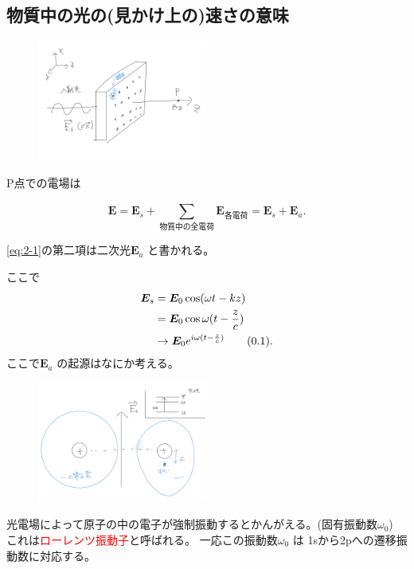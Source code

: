 \documentclass[dvipdfmx]{jsarticle}
\def\theequation{\thesection.\arabic{equation}}
\begin{document}
\subsection{物質中の光の(見かけ上の)速さの意味}
\begin{figure}[H]
	\centering
	\includegraphics[width=0.5\textwidth]{fig2/Fig-3.jpg}
	\label{fig:fig2-Fig-3-jpg}
\end{figure}
P点での電場は
\begin{tcolorbox}[colback=green!10!white]
\begin{equation}
\label{eq:2-1}
\bm{E}=\bm{E}_s+\sum_{\text{物質中の全電荷}}^{} \bm{E}_{\text{各電荷}}=\bm{E}_s+\bm{E}_a
.\end{equation}
\end{tcolorbox}
\eqref{eq:2-1}の第二項は二次光$\bm{E}_a$ と書かれる。

ここで
\begin{align*}
	\label{eq:2-2}
	\bm{E}_s&= \bm{E}_0 \cos (\omega t-kz) \\
	&= \bm{E}_0 \cos \omega(t-\frac{z}{c}) \\
	&\to  \bm{E}_0e^{i\omega(t-\frac{z}{c})} 
	\stepcounter{equation}\tag{\theequation} 
.\end{align*}
ここで$\bm{E}_a$ の起源はなにか考える。
\begin{figure}[H]
	\centering
	\includegraphics[width=0.5\textwidth]{fig2/Fig-4.jpg}
	\label{fig:fig2-Fig-4-jpg}
\end{figure}
光電場によって原子の中の電子が強制振動するとかんがえる。(固有振動数$\omega_0$)
これは\textcolor{red}{ローレンツ振動子}と呼ばれる。
一応この振動数$\omega_0$ は 1sから2pへの遷移振動数に対応する。
\end{document}

